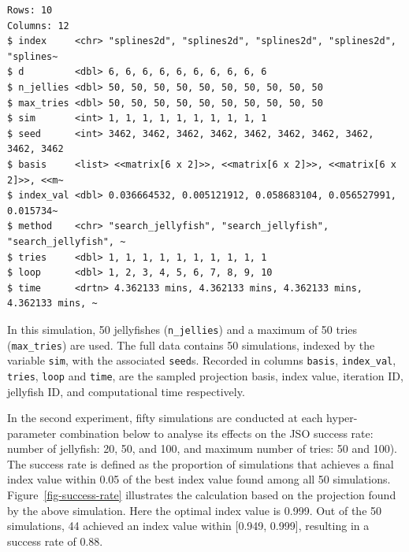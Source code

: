 \documentclass[
  number,
  preprint,
  3p]{elsarticle}
\begin{document}
\begin{verbatim}
Rows: 10
Columns: 12
$ index     <chr> "splines2d", "splines2d", "splines2d", "splines2d", "splines~
$ d         <dbl> 6, 6, 6, 6, 6, 6, 6, 6, 6, 6
$ n_jellies <dbl> 50, 50, 50, 50, 50, 50, 50, 50, 50, 50
$ max_tries <dbl> 50, 50, 50, 50, 50, 50, 50, 50, 50, 50
$ sim       <int> 1, 1, 1, 1, 1, 1, 1, 1, 1, 1
$ seed      <int> 3462, 3462, 3462, 3462, 3462, 3462, 3462, 3462, 3462, 3462
$ basis     <list> <<matrix[6 x 2]>>, <<matrix[6 x 2]>>, <<matrix[6 x 2]>>, <<m~
$ index_val <dbl> 0.036664532, 0.005121912, 0.058683104, 0.056527991, 0.015734~
$ method    <chr> "search_jellyfish", "search_jellyfish", "search_jellyfish", ~
$ tries     <dbl> 1, 1, 1, 1, 1, 1, 1, 1, 1, 1
$ loop      <dbl> 1, 2, 3, 4, 5, 6, 7, 8, 9, 10
$ time      <drtn> 4.362133 mins, 4.362133 mins, 4.362133 mins, 4.362133 mins, ~
\end{verbatim}

In this simulation, 50 jellyfishes (\texttt{n\_jellies}) and a maximum
of 50 tries (\texttt{max\_tries}) are used. The full data contains 50
simulations, indexed by the variable \texttt{sim}, with the associated
\texttt{seed}s. Recorded in columns \texttt{basis}, \texttt{index\_val},
\texttt{tries}, \texttt{loop} and \texttt{time}, are the sampled
projection basis, index value, iteration ID, jellyfish ID, and
computational time respectively.

In the second experiment, fifty simulations are conducted at each
hyper-parameter combination below to analyse its effects on the JSO
success rate: number of jellyfish: 20, 50, and 100, and maximum number
of tries: 50 and 100). The success rate is defined as the proportion of
simulations that achieves a final index value within 0.05 of the best
index value found among all 50 simulations.
Figure~\ref{fig-success-rate} illustrates the calculation based on the
projection found by the above simulation. Here the optimal index value
is 0.999. Out of the 50 simulations, 44 achieved an index value within
{[}0.949, 0.999{]}, resulting in a success rate of 0.88.
\end{document}
